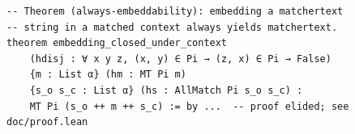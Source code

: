 \begin{lstlisting}
-- Theorem (always-embeddability): embedding a matchertext
-- string in a matched context always yields matchertext.
theorem embedding_closed_under_context
    (hdisj : ∀ x y z, (x, y) ∈ Pi → (z, x) ∈ Pi → False)
    {m : List α} (hm : MT Pi m)
    {s_o s_c : List α} (hs : AllMatch Pi s_o s_c) :
    MT Pi (s_o ++ m ++ s_c) := by ...  -- proof elided; see doc/proof.lean
\end{lstlisting}
